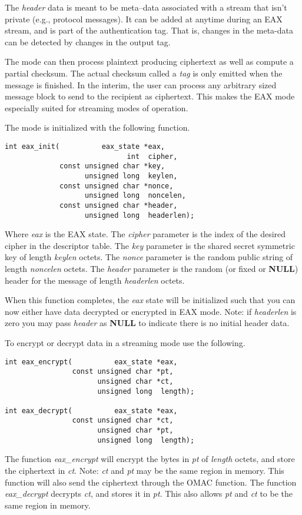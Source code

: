 \documentclass[synpaper]{book}
\begin{document}
The \textit{header} data is meant to be meta--data associated with a stream that isn't private (e.g., protocol messages).  It can
be added at anytime during an EAX stream, and is part of the authentication tag.  That is, changes in the meta-data can be detected by changes in the output tag.

The mode can then process plaintext producing ciphertext as well as compute a partial checksum.  The actual checksum
called a \textit{tag} is only emitted when the message is finished.  In the interim, the user can process any arbitrary
sized message block to send to the recipient as ciphertext.  This makes the EAX mode especially suited for streaming modes
of operation.

The mode is initialized with the following function.
\begin{verbatim}
int eax_init(          eax_state *eax,
                             int  cipher,
             const unsigned char *key,
                   unsigned long  keylen,
             const unsigned char *nonce,
                   unsigned long  noncelen,
             const unsigned char *header,
                   unsigned long  headerlen);
\end{verbatim}

Where \textit{eax} is the EAX state.  The \textit{cipher} parameter is the index of the desired cipher in the descriptor table.
The \textit{key} parameter is the shared secret symmetric key of length \textit{keylen} octets.  The \textit{nonce} parameter is the
random public string of length \textit{noncelen} octets.  The \textit{header} parameter is the random (or fixed or \textbf{NULL}) header for the
message of length \textit{headerlen} octets.

When this function completes, the \textit{eax} state will be initialized such that you can now either have data decrypted or
encrypted in EAX mode.  Note: if \textit{headerlen} is zero you may pass \textit{header} as \textbf{NULL} to indicate there is no initial header data.

To encrypt or decrypt data in a streaming mode use the following.
 
\begin{verbatim}
int eax_encrypt(          eax_state *eax,
                const unsigned char *pt,
                      unsigned char *ct,
                      unsigned long  length);

int eax_decrypt(          eax_state *eax,
                const unsigned char *ct,
                      unsigned char *pt,
                      unsigned long  length);
\end{verbatim}
The function \textit{eax\_encrypt} will encrypt the bytes in \textit{pt} of \textit{length} octets, and store the ciphertext in
\textit{ct}.  Note: \textit{ct} and \textit{pt} may be the same region in memory.   This function will also send the ciphertext
through the OMAC function.  The function \textit{eax\_decrypt} decrypts \textit{ct}, and stores it in \textit{pt}.  This also allows
\textit{pt} and \textit{ct} to be the same region in memory.
\end{document}
